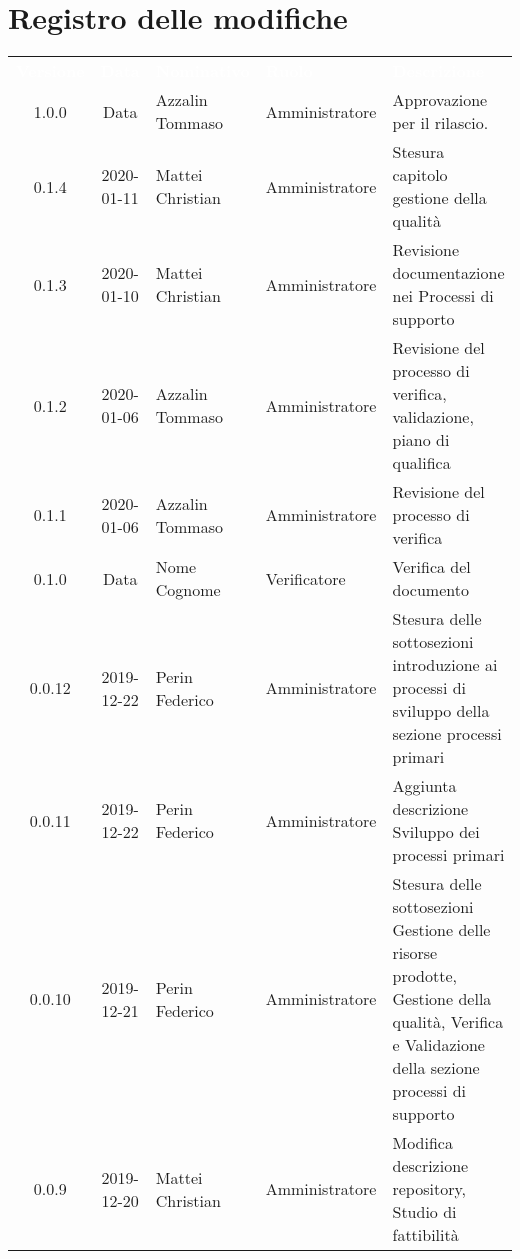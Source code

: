 \section*{Registro delle modifiche}
{
\renewcommand{\arraystretch}{1.5}
\centering
\begin{longtable}{c c  C{4cm}  C{3cm} C{4cm}}
\textcolor{white}{\textbf{Versione}} & \textcolor{white}{\textbf{Data}} & \textcolor{white}{\textbf{Nominativo}} & \textcolor{white}{\textbf{Ruolo}} & \textcolor{white}{\textbf{Descrizione}}\\	


1.0.0 & Data & Azzalin Tommaso & Amministratore & Approvazione per il rilascio.  \\


0.1.4 & 2020-01-11 & Mattei Christian & Amministratore & Stesura capitolo gestione della qualità \\

0.1.3 & 2020-01-10 & Mattei Christian & Amministratore & Revisione documentazione nei Processi di supporto \\

0.1.2 & 2020-01-06 & Azzalin Tommaso & Amministratore & Revisione del processo di verifica, validazione, piano di qualifica \\

0.1.1 & 2020-01-06 & Azzalin Tommaso & Amministratore & Revisione del processo di verifica \\

0.1.0 & Data & Nome Cognome & Verificatore & Verifica del documento \\

0.0.12 & 2019-12-22 & Perin Federico & Amministratore & Stesura delle sottosezioni introduzione ai processi di sviluppo della sezione processi primari\\

0.0.11 & 2019-12-22 & Perin Federico  & Amministratore & Aggiunta descrizione Sviluppo dei processi primari \\

0.0.10 & 2019-12-21 & Perin Federico & Amministratore & Stesura delle sottosezioni Gestione delle risorse prodotte, Gestione della qualità, Verifica e Validazione della sezione processi di supporto \\

0.0.9 & 2019-12-20 & Mattei Christian & Amministratore & Modifica descrizione repository, Studio di fattibilità \\


\end{longtable}}
